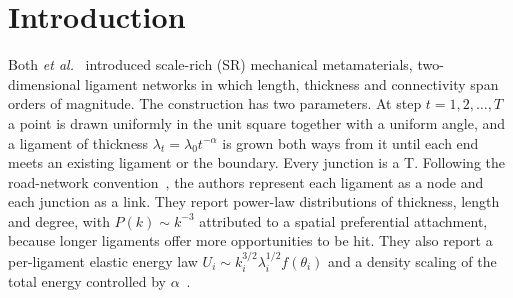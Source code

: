 \documentclass[pre,twocolumn,superscriptaddress,amsmath,amssymb,floatfix]{revtex4-2}
\begin{document}
\section{Introduction}

Both \textit{et al.}~\cite{both2026} introduced scale-rich (SR) mechanical
metamaterials, two-dimensional ligament networks in which length, thickness and
connectivity span orders of magnitude. The construction has two parameters. At step
$t=1,2,\dots,T$ a point is drawn uniformly in the unit square together with a uniform
angle, and a ligament of thickness $\lambda_t=\lambda_0t^{-\alpha}$ is grown both ways
from it until each end meets an existing ligament or the boundary. Every junction is a
T. Following the road-network convention~\cite{rosvall2005,kalapala2006}, the authors
represent each ligament as a node and each junction as a link. They report power-law
distributions of thickness, length and degree, with $P(k)\sim k^{-3}$ attributed to a
spatial preferential attachment, because longer ligaments offer more opportunities to
be hit. They also report a per-ligament elastic energy law
$U_i\sim k_i^{3/2}\lambda_i^{1/2}f(\theta_i)$ and a density scaling of the total
energy controlled by $\alpha$~\cite{both2026}.
\end{document}
